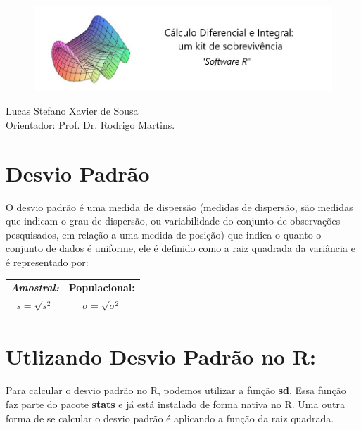 \documentclass[12pt,a4paper]{article}
\begin{document}
	
\begin{figure}[htb]
\includegraphics[scale=0.6]{logo.jpg}
\end{figure}

	
	
	\begin{center}Lucas Stefano Xavier de Sousa \\ Orientador: Prof. Dr. Rodrigo Martins.\end{center}
	
	
	\vspace{2cm}
	
	\section*{Desvio Padrão}
	
	O desvio padrão é uma medida de dispersão (medidas de dispersão, são medidas  que indicam o grau de dispersão, ou variabilidade do conjunto de  observações pesquisados, em relação a uma medida de posição) que indica o quanto o conjunto de dados é uniforme, ele é definido como a raiz quadrada da variância e é representado por:
	
	\begin{center}									
		\vspace{0.2cm}
		\begin{tabular}{|c||c|}
			\hline
			\textit{\textbf{Amostral:}} & \textbf{Populacional:} \\
			$s= \sqrt{s^2}$             &  $	\sigma= \sqrt{\sigma^2}$ \\
			\hline
		\end{tabular}
	\end{center}

	
	
	\section*{Utlizando Desvio Padrão no R:}
	
	Para calcular o desvio padrão no R, podemos utilizar a função \textbf{sd}. Essa função faz parte do pacote \textbf{stats} e já está instalado de forma nativa no R.
	Uma outra forma de se calcular o desvio padrão é aplicando a função da raiz quadrada.
\end{document}
